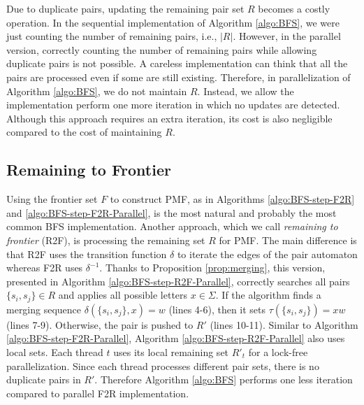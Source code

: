 \documentclass[12pt]{article}
\begin{document}
Due to duplicate pairs, updating the remaining pair set $R$ becomes a costly operation. In the sequential implementation of Algorithm \ref{algo:BFS}, we were just counting the number of remaining pairs, i.e., $|R|$. However, in the parallel version, correctly counting the number of remaining pairs while allowing duplicate pairs is not possible. A careless implementation can think that all the pairs are processed even if some are still existing. Therefore, in parallelization of Algorithm \ref{algo:BFS}, we do not maintain $R$. Instead, we allow the implementation perform one more iteration in which no updates are detected. Although this approach requires an extra iteration, its cost is also negligible compared to the cost of maintaining $R$.

\subsection{Remaining to Frontier}
\label{sec:BFS-R2F-parallel}

Using the frontier set $F$ to construct PMF, as in Algorithms \ref{algo:BFS-step-F2R} and \ref{algo:BFS-step-F2R-Parallel}, is the most natural and probably the most common BFS implementation. Another approach, which we call \textit{remaining to frontier} (R2F), is processing the remaining set $R$ for PMF. The main difference is that R2F uses the transition function $\delta$ to iterate the edges of the pair automaton whereas F2R uses $\delta^{-1}$. Thanks to Proposition \ref{prop:merging}, this version, presented in Algorithm \ref{algo:BFS-step-R2F-Parallel}, correctly searches all pairs $\{s_i,s_j\}\in R$ and applies all possible letters $x \in \Sigma$. If the algorithm finds a merging sequence $\delta(\{ s_i,s_j \}, x) = w$ (lines 4-6), then it sets $\tau(\{ s_i,s_j \}) = xw$ (lines 7-9). Otherwise, the pair is pushed to $R'$ (lines 10-11). Similar to Algorithm \ref{algo:BFS-step-F2R-Parallel}, Algorithm \ref{algo:BFS-step-R2F-Parallel} also uses local sets. Each thread $t$ uses its local remaining set $R'_t$ for a lock-free parallelization. Since each thread processes different pair sets, there is no duplicate pairs in $R'$. Therefore Algorithm \ref{algo:BFS} performs one less iteration compared to parallel F2R implementation.
\end{document}
